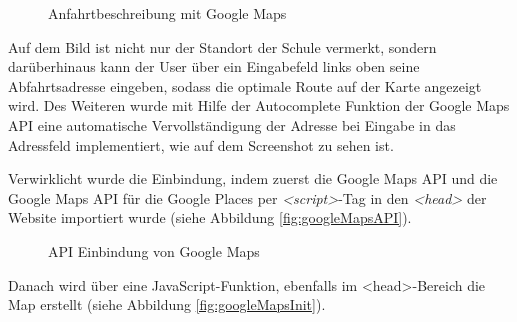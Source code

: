 \begin{figure}[!htbp]
	\caption{Anfahrtbeschreibung mit Google Maps}
	\label{fig:googleMaps}
\end{figure}

Auf dem Bild ist nicht nur der Standort der Schule vermerkt, sondern darüberhinaus kann der User über ein Eingabefeld links oben seine Abfahrtsadresse eingeben, sodass die optimale Route auf der Karte angezeigt wird. Des Weiteren wurde mit Hilfe der Autocomplete Funktion der Google Maps API eine automatische Vervollständigung der Adresse bei Eingabe in das Adressfeld implementiert, wie auf dem Screenshot zu sehen ist.
\par
Verwirklicht wurde die Einbindung, indem zuerst die Google Maps API und die Google Maps API für die Google Places per \textit{<script>}-Tag in den \textit{<head>} der Website importiert wurde (siehe Abbildung \vref{fig:googleMapsAPI}).

\begin{figure}[!htbp]
	\caption{API Einbindung von Google Maps}
	\label{fig:googleMapsAPI}
\end{figure}

Danach wird über eine JavaScript-Funktion, ebenfalls im <head>-Bereich die Map erstellt (siehe Abbildung \vref{fig:googleMapsInit}).


